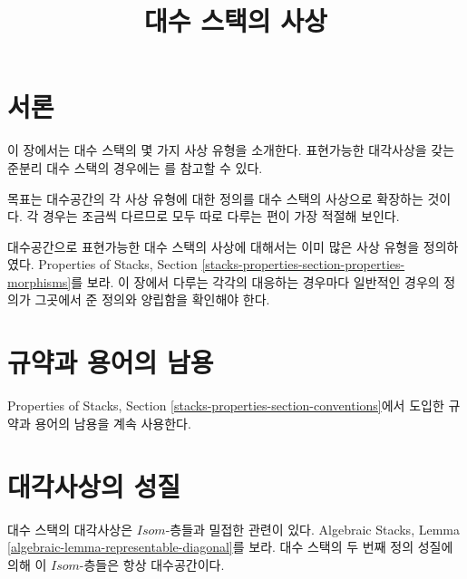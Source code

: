 

%


\title{대수 스택의 사상}


\maketitle

\label{section-phantom}

\tableofcontents

\section{서론}
\label{section-introduction}

\noindent
이 장에서는 대수 스택의 몇 가지 사상 유형을 소개한다.
표현가능한 대각사상을 갖는 준분리 대수 스택의 경우에는
\cite{LM-B}를 참고할 수 있다.

\medskip\noindent
목표는 대수공간의 각 사상 유형에 대한 정의를 대수 스택의 사상으로
확장하는 것이다. 각 경우는 조금씩 다르므로 모두 따로 다루는 편이
가장 적절해 보인다.

\medskip\noindent
대수공간으로 표현가능한 대수 스택의 사상에 대해서는 이미 많은
사상 유형을 정의하였다. Properties of Stacks,
Section \ref{stacks-properties-section-properties-morphisms}를 보라.
이 장에서 다루는 각각의 대응하는 경우마다 일반적인 경우의 정의가
그곳에서 준 정의와 양립함을 확인해야 한다.




\section{규약과 용어의 남용}
\label{section-conventions}

\noindent
Properties of Stacks, Section
\ref{stacks-properties-section-conventions}에서 도입한 규약과
용어의 남용을 계속 사용한다.




\section{대각사상의 성질}
\label{section-diagonals}

\noindent
대수 스택의 대각사상은 $\mathit{Isom}$-층들과 밀접한 관련이 있다.
Algebraic Stacks, Lemma
\ref{algebraic-lemma-representable-diagonal}를 보라.
대수 스택의 두 번째 정의 성질에 의해 이 $\mathit{Isom}$-층들은
항상 대수공간이다.

